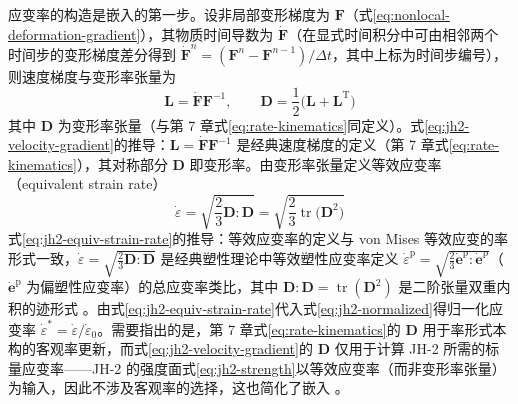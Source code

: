 应变率的构造是嵌入的第一步。设非局部变形梯度为 $\mathbf{F}$（式\eqref{eq:nonlocal-deformation-gradient}），其物质时间导数为 $\dot{\mathbf{F}}$（在显式时间积分中可由相邻两个时间步的变形梯度差分得到 $\dot{\mathbf{F}}^{n}=(\mathbf{F}^{n}-\mathbf{F}^{n-1})/\Delta t$，其中上标为时间步编号），则速度梯度与变形率张量为
\begin{equation}
  \mathbf{L}=\dot{\mathbf{F}}\mathbf{F}^{-1},
  \qquad
  \mathbf{D}=\frac{1}{2}\bigl(\mathbf{L}+\mathbf{L}^{\mathrm{T}}\bigr)
  \label{eq:jh2-velocity-gradient}
\end{equation}
其中 $\mathbf{D}$ 为变形率张量（与第 7 章式\eqref{eq:rate-kinematics}同定义）。式\eqref{eq:jh2-velocity-gradient}的推导：$\mathbf{L}=\dot{\mathbf{F}}\mathbf{F}^{-1}$ 是经典速度梯度的定义（第 7 章式\eqref{eq:rate-kinematics}），其对称部分 $\mathbf{D}$ 即变形率。由变形率张量定义等效应变率（equivalent strain rate）
\begin{equation}
  \dot{\varepsilon}
  =\sqrt{\frac{2}{3}\mathbf{D}:\mathbf{D}}
  =\sqrt{\frac{2}{3}\operatorname{tr}\bigl(\mathbf{D}^{2}\bigr)}
  \label{eq:jh2-equiv-strain-rate}
\end{equation}
式\eqref{eq:jh2-equiv-strain-rate}的推导：等效应变率的定义与 von Mises 等效应变的率形式一致，$\dot{\varepsilon}=\sqrt{\tfrac{2}{3}\mathbf{D}:\mathbf{D}}$ 是经典塑性理论中等效塑性应变率定义 $\dot{\varepsilon}^{\mathrm{p}}=\sqrt{\tfrac{2}{3}\dot{\mathbf{e}}^{\mathrm{p}}:\dot{\mathbf{e}}^{\mathrm{p}}}$（$\dot{\mathbf{e}}^{\mathrm{p}}$ 为偏塑性应变率）的总应变率类比，其中 $\mathbf{D}:\mathbf{D}=\operatorname{tr}(\mathbf{D}^{2})$ 是二阶张量双重内积的迹形式 \cite{Lai2018}。由式\eqref{eq:jh2-equiv-strain-rate}代入式\eqref{eq:jh2-normalized}得归一化应变率 $\dot{\varepsilon}^{*}=\dot{\varepsilon}/\dot{\varepsilon}_{0}$。需要指出的是，第 7 章式\eqref{eq:rate-kinematics}的 $\mathbf{D}$ 用于率形式本构的客观率更新，而式\eqref{eq:jh2-velocity-gradient}的 $\mathbf{D}$ 仅用于计算 JH-2 所需的标量应变率——JH-2 的强度面式\eqref{eq:jh2-strength}以等效应变率（而非变形率张量）为输入，因此不涉及客观率的选择，这也简化了嵌入 \cite{Lai2018,ZhuZhao2021}。

